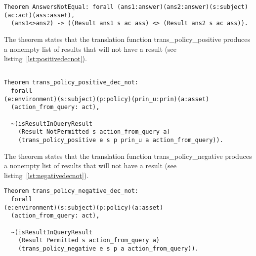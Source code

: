\begin{lstlisting}
Theorem AnswersNotEqual: forall (ans1:answer)(ans2:answer)(s:subject)(ac:act)(ass:asset),
  (ans1<>ans2) -> ((Result ans1 s ac ass) <> (Result ans2 s ac ass)).

\end{lstlisting}

The theorem  states that the translation function trans_policy_positive produces a nonempty list of results that will not have a  result (see listing~\ref{lst:positivedecnot}).


\begin{lstlisting}

Theorem trans_policy_positive_dec_not:
  forall 
(e:environment)(s:subject)(p:policy)(prin_u:prin)(a:asset)
  (action_from_query: act),
 
  ~(isResultInQueryResult 
    (Result NotPermitted s action_from_query a)
    (trans_policy_positive e s p prin_u a action_from_query)).
\end{lstlisting}

The theorem  states that the translation function trans_policy_negative produces a nonempty list of results that will not have a  result (see listing~\ref{lst:negativedecnot}).

\begin{lstlisting}
Theorem trans_policy_negative_dec_not:
  forall 
(e:environment)(s:subject)(p:policy)(a:asset)
  (action_from_query: act),
 
  ~(isResultInQueryResult 
    (Result Permitted s action_from_query a)
    (trans_policy_negative e s p a action_from_query)).

\end{lstlisting}

